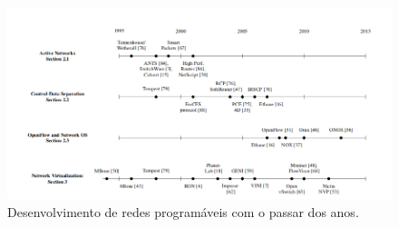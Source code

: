 \begin{figure}[!h]
	\caption{ Desenvolvimento de redes programáveis com o passar dos
	anos.
}
  \centering
  \includegraphics[scale=0.5]{Imagens/SDNHistory(1).png} 
  
  \label{SDNHistory(1).png}
\end{figure}

